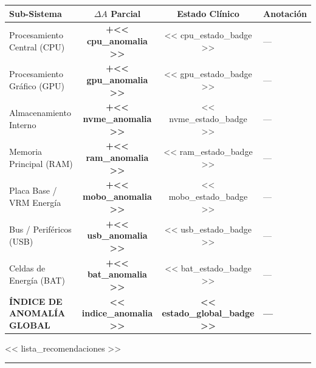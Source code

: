 \documentclass[11pt, a4paper, final]{article}
\newcommand{\sectionrule}{%
  \vspace{4pt}%
  \noindent\textcolor{AMBorder}{\rule{\linewidth}{0.5pt}}%
  \vspace{4pt}%
}
\newcommand{\rowalt}{\rowcolor{AMLight}}
\newcommand{\thcell}[1]{\color{AMPrimary}\textbf{#1}}
\begin{document}
\begin{tabularx}{\linewidth}{@{} X c c l @{}}
  \toprule
  \thcell{Sub-Sistema} & \thcell{$\Delta A$ Parcial} &
  \thcell{Estado Clínico} & \thcell{Anotación} \\
  \midrule
  Procesamiento Central (CPU)   & \textbf{+<< cpu_anomalia >>}  & << cpu_estado_badge >>  & --- \\
  \rowalt
  Procesamiento Gráfico (GPU)   & \textbf{+<< gpu_anomalia >>}  & << gpu_estado_badge >>  & --- \\
  Almacenamiento Interno        & \textbf{+<< nvme_anomalia >>} & << nvme_estado_badge >> & --- \\
  \rowalt
  Memoria Principal (RAM)       & \textbf{+<< ram_anomalia >>}  & << ram_estado_badge >>  & --- \\
  Placa Base / VRM Energía      & \textbf{+<< mobo_anomalia >>} & << mobo_estado_badge >> & --- \\
  \rowalt
  Bus / Periféricos (USB)       & \textbf{+<< usb_anomalia >>}  & << usb_estado_badge >>  & --- \\
  \rowalt
  Celdas de Energía (BAT)       & \textbf{+<< bat_anomalia >>}  & << bat_estado_badge >>  & --- \\
  \midrule
  \thcell{ÍNDICE DE ANOMALÍA GLOBAL} &
  \thcell{<< indice_anomalia >>} &
  \thcell{<< estado_global_badge >>} &
  \thcell{---} \\
  \bottomrule
\end{tabularx}

\vspace{0.6cm}

\begin{tcolorbox}[
  enhanced,
  colback   = AMLight,
  colframe  = AMPrimary,
  boxrule   = 0.8pt,
  arc       = 0pt,
  title     = {\bfseries Directivas de Intervención},
  coltitle  = white,
  attach boxed title to top left={yshift=-2mm, xshift=8mm},
  boxed title style={colback=AMPrimary, arc=0pt, boxrule=0pt},
  left=10pt, right=10pt, top=12pt, bottom=8pt
]
  \small
  \begin{enumerate}[leftmargin=*, itemsep=4pt, topsep=2pt]
    << lista_recomendaciones >>
  \end{enumerate}
\end{tcolorbox}


\vspace{0.8cm}
\sectionrule
\end{document}

